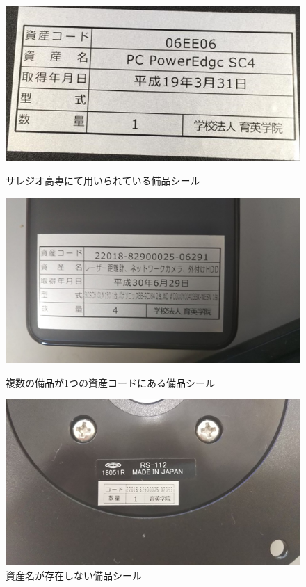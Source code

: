 \documentclass[11pt,a4j]{jarticle}
\begin{document}
\begin{figure}[h]
\begin{center}
\includegraphics[keepaspectratio, scale=0.45]{gaiyo_1}
\caption{サレジオ高専にて用いられている備品シール}
\end{center}

\begin{center}
\includegraphics[keepaspectratio, scale=0.45]{gaiyo_2}
\caption{複数の備品が1つの資産コードにある備品シール}
\end{center}

\begin{center}
\includegraphics[keepaspectratio, scale=0.45]{gaiyo_3}
\caption{資産名が存在しない備品シール}
\end{center}

\end{figure}
\end{document}
